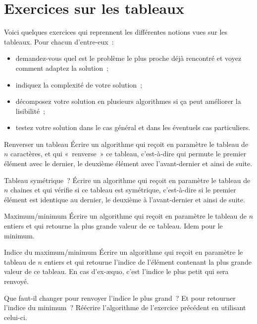 \chapter{Exercices sur les tableaux}

	Voici quelques exercices
	qui reprennent les différentes notions vues sur les tableaux.
	Pour chacun d’entre-eux~:
	\begin{itemize}
	\item
		demandez-vous quel est le problème le plus proche déjà
		rencontré et voyez comment adaptez la solution~;
	\item
		indiquez la complexité de votre solution~;
	\item
		décomposez votre solution en plusieurs algorithmes 
		si ça peut améliorer la lisibilité~;
	\item
		testez votre solution dans le cas général
		et dans les éventuels cas particuliers.
	\end{itemize}
	
	\begin{Exercice}{Renverser un tableau}
		Écrire un algorithme qui reçoit en paramètre 
		le tableau  de $n$ caractères, 
		et qui «~renverse~» ce tableau, 
		c’est-à-dire qui permute le premier élément avec le dernier, 
		le deuxième élément avec l’avant-dernier et ainsi de suite.
	\end{Exercice}
	
	\begin{Exercice}{Tableau symétrique~?}
		Écrire un algorithme qui reçoit en paramètre 
		le tableau  de $n$ chaines 
		et qui vérifie si ce tableau est symétrique, 
		c’est-à-dire si le premier élément est identique au dernier, 
		le deuxième à l’avant-dernier et ainsi de suite.
	\end{Exercice}
		
	\begin{Exercice}{Maximum/minimum}
		Écrire un algorithme qui reçoit en paramètre le tableau
		 de $n$ entiers et qui
		retourne la plus grande valeur de ce tableau. Idem pour le minimum.
	\end{Exercice}
	
	\begin{Exercice}{Indice du maximum/minimum}
		\label{ex:indiceminmax}
		Écrire un algorithme qui reçoit en paramètre 
		le tableau  de $n$ entiers 
		et qui retourne l’indice de l’élément contenant 
		la plus grande valeur de ce tableau. 
		En cas d’ex-æquo, c’est l’indice le plus petit qui sera renvoyé.
		
		Que faut-il changer pour renvoyer l’indice le plus grand~?
		Et pour retourner l’indice du minimum~? 
		Réécrire l’algorithme de l’exercice précédent en utilisant celui-ci.
	\end{Exercice}
		
